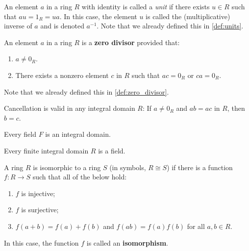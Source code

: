 \documentclass[../main.tex]{subfiles}
\begin{document}
\begin{definition}
An element $a$ in a ring $R$ with identity is called a \textit{unit} if there exists $u \in R$ such that $au = 1_R = ua$. In this case, the element $u$ is called the (multiplicative) inverse of $a$ and is denoted $a^{-1}$. Note that we already defined this in \ref{def:units}.
\end{definition}







\begin{definition}
An element $a$ in a ring $R$ is a \textbf{zero divisor} provided that:
\begin{enumerate}
    \item $a \neq 0_R$.
    \item There exists a nonzero element $c$ in $R$ such that $ac = 0_R$ or $ca = 0_R$.
\end{enumerate}
Note that we already defined this in \ref{def:zero_divisor}.
\end{definition}




\begin{theorem}
Cancellation is valid in any integral domain $R$: If $a \neq 0_R$ and $ab = ac$ in $R$, then $b = c$.
\end{theorem}

\begin{theorem}
Every field $F$ is an integral domain.
\end{theorem}

\begin{theorem}
Every finite integral domain $R$ is a field.
\end{theorem}






\begin{definition}[Isomorphism]
A ring $R$ is isomorphic to a ring $S$ (in symbols, $R \cong S$) if there is a function $f: R \to S$ such that all of the below hold:
\begin{enumerate}
    \item $f$ is injective;
    \item $f$ is surjective;
    \item $f(a + b) = f(a) + f(b)$ \quad and \quad $f(ab) = f(a) f(b)$ for all $a, b \in R$.
\end{enumerate}
In this case, the function $f$ is called an \textbf{isomorphism}.
\end{definition}
\end{document}
